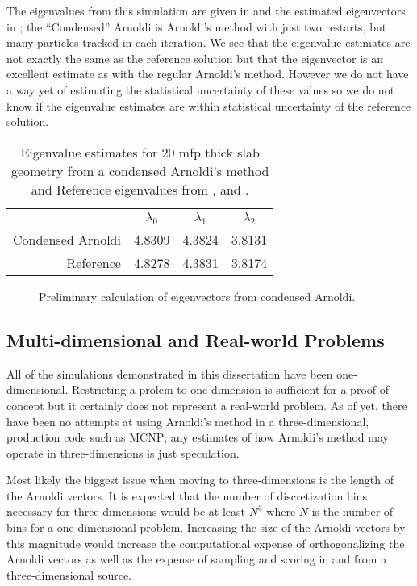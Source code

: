 The eigenvalues from this simulation are given in  and the estimated eigenvectors in ; the ``Condensed'' Arnoldi is Arnoldi's method with just two restarts, but many particles tracked in each iteration.  We see that the eigenvalue estimates are not exactly the same as the reference solution but that the eigenvector is an excellent estimate as with the regular Arnoldi's method.  However we do not have a way yet of estimating the statistical uncertainty of these values so we do not know if the eigenvalue estimates are within statistical uncertainty of the reference solution.
\begin{table}[h] \centering
    \begin{tabular}{rccc}
        \toprule
         & $\lambda_0$ & $\lambda_1$ & $\lambda_2$ \\
         \midrule
        Condensed Arnoldi & 4.8309 & 4.3824 & 3.8131 \\
        Reference & 4.8278 & 4.3831 & 3.8174 \\
        \bottomrule
\end{tabular}
    \caption{Eigenvalue estimates for 20 mfp thick slab geometry from a condensed Arnoldi's method and Reference eigenvalues from \cite{Garis:1991One-s-0}, and \cite{Dahl:1979Eigen-0}.}
    \label{tab:CondensedArnoldi}
\end{table}

\begin{figure} \centering
    
    \caption{Preliminary calculation of eigenvectors from condensed Arnoldi.}
    \label{fig:CondensedArnoldiVectors}
\end{figure}

\subsection{Multi-dimensional and Real-world Problems}
All of the simulations demonstrated in this dissertation have been one-dimensional.  Restricting a prolem to one-dimension is sufficient for a proof-of-concept but it certainly does not represent a real-world problem.  As of yet, there have been no attempts at using Arnoldi's method in a three-dimensional, production code such as MCNP; any estimates of how Arnoldi's method may operate in three-dimensions is just speculation.

Most likely the biggest issue when moving to three-dimensions is the length of the Arnoldi vectors.  It is expected that the number of discretization bins necessary for three dimensions would be at least $N^3$ where $N$ is the number of bins for a one-dimensional problem.  Increasing the size of the Arnoldi vectors by this magnitude would increase the computational expense of orthogonalizing the Arnoldi vectors as well as the expense of sampling and scoring in and from a three-dimensional source.  

